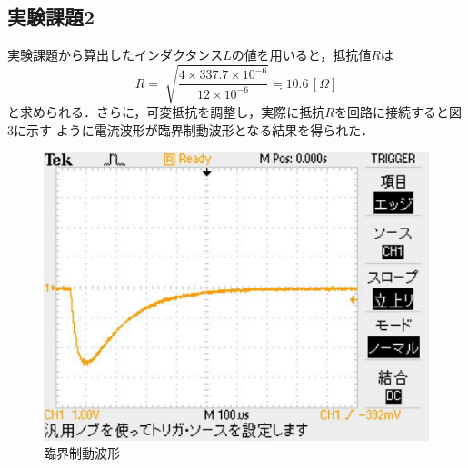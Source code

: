 \subsection{実験課題2}
実験課題から算出したインダクタンス$L$の値を用いると，抵抗値$R$は
$$
R=\sqrt[]{\frac{4\times 337.7\times10^{-6}}{12\times10^{-6}}}\fallingdotseq 10.6\,[\Omega]
$$
と求められる．さらに，可変抵抗を調整し，実際に抵抗$R$を回路に接続すると図3に示す
ように電流波形が臨界制動波形となる結果を得られた．
\begin{figure}[H]
    \begin{center}
        \includegraphics[scale=0.5]{figure3.pdf}
        \caption{臨界制動波形}
    \end{center}
\end{figure}